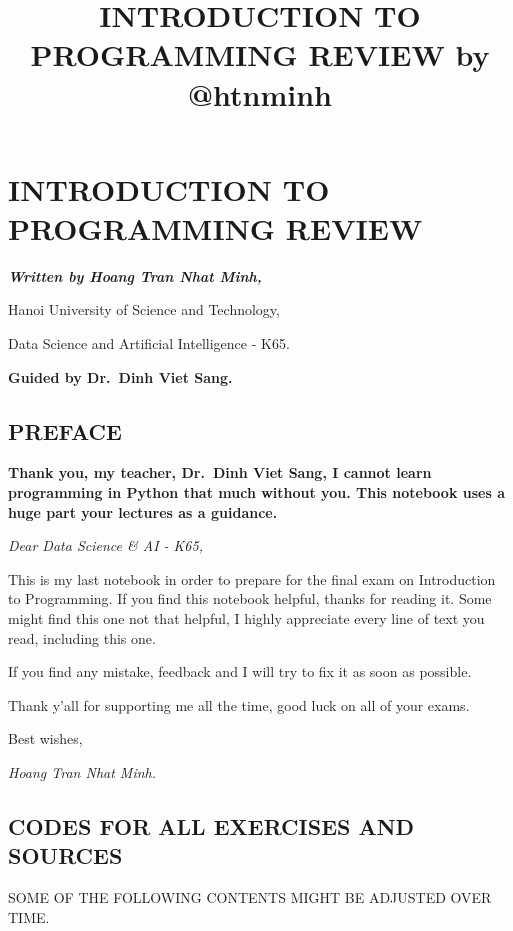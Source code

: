 \documentclass[11pt]{article}
\title{INTRODUCTION TO PROGRAMMING REVIEW by @htnminh}
\begin{document}
    
    \maketitle
    \tableofcontents
    \newpage

    
    \hypertarget{introduction-to-programming-review}{%
\section{\texorpdfstring{\textbf{INTRODUCTION TO PROGRAMMING
REVIEW}}{INTRODUCTION TO PROGRAMMING REVIEW}}\label{introduction-to-programming-review}}

\textbf{\emph{Written by Hoang Tran Nhat Minh,}}

Hanoi University of Science and Technology,

Data Science and Artificial Intelligence - K65.

\textbf{Guided by Dr.~Dinh Viet Sang.}

    \hypertarget{preface}{%
\subsection{PREFACE}\label{preface}}

    \textbf{Thank you, my teacher, Dr.~Dinh Viet Sang, I cannot learn
programming in Python that much without you. This notebook uses a huge
part your lectures as a guidance.}

\emph{Dear Data Science \& AI - K65,}

This is my last notebook in order to prepare for the final exam on
Introduction to Programming. If you find this notebook helpful, thanks
for reading it. Some might find this one not that helpful, I highly
appreciate every line of text you read, including this one.

If you find any mistake, feedback and I will try to fix it as soon as
possible.

Thank y'all for supporting me all the time, good luck on all of your
exams.

Best wishes,

\emph{Hoang Tran Nhat Minh.}

    \hypertarget{codes-for-all-exercises-and-sources}{%
\subsection{CODES FOR ALL EXERCISES AND
SOURCES}\label{codes-for-all-exercises-and-sources}}

    SOME OF THE FOLLOWING CONTENTS MIGHT BE ADJUSTED OVER TIME.
\end{document}
